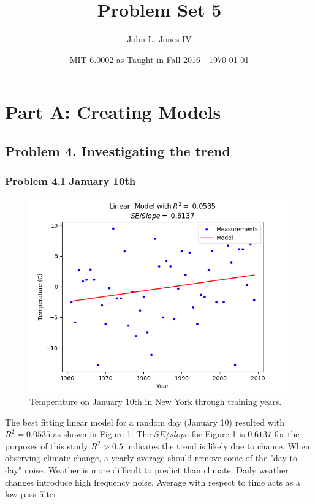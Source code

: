 \documentclass[letterpaper]{article}
\title{Problem Set 5}
\author{John L. Jones IV}
\date{MIT 6.0002 as Taught in Fall 2016 - \today}
\begin{document}
	\maketitle
	\section*{Part A: Creating Models}
	\subsection*{Problem 4. Investigating the trend}
	\subsubsection*{Problem 4.I January 10th}
	\begin{figure}[h]
		\includegraphics[scale=0.625]{Figure_1_A4I}
		\centering
		\caption{Temperature on January 10th in New York through training years.}
		\label{fig:Jan 10 NY}
	\end{figure}
	The best fitting linear model for a random day (January 10) resulted with $R^2 = 0.0535$ as shown in Figure \ref{fig:Jan 10 NY}.
	The $SE/slope$ for Figure \ref{fig:Jan 10 NY} is $0.6137$ for the purposes of this study $R^2 > 0.5$ indicates the trend is likely due to chance.
	When observing climate change, a yearly average should remove some of the "day-to-day" noise.
	Weather is more difficult to predict than climate.
	Daily weather changes introduce high frequency noise. Average with respect to time acts as a low-pass filter.
\end{document}
